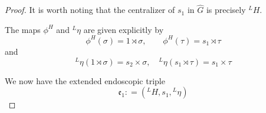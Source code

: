 \documentclass[11pt]{amsart}
\numberwithin{equation}{section}
\def\Irr{\mathrm{Irr}}
\def\H{\mathrm{H}}
\def\SO{\mathrm{SO}}
\def\PGL{\mathrm{PGL}}
\def\bW{\mathbf{W}}
\def\R{\mathbb{R}}
\def\C{\mathbb{C}}
\def\n{\mathbf{n}}
\newcommand{\<}{\left\langle}
\renewcommand{\>}{\right\rangle}
\begin{document}
\begin{proof}
  It is worth noting that the centralizer of $s_1$ in $\widehat{G}$ is precisely ${}^LH$.   
  
  
   
The maps $\phi^H$ and ${}^L\eta$ are given explicitly by
\[
\phi^H(\sigma) = 1 \rtimes \sigma, \quad \quad \phi^H(\tau) = s_1 \rtimes \tau
\]
and
\[
{}^L\eta (1 \rtimes \sigma) = s_2  \times \sigma, \quad {}^L\eta(s_1 \rtimes \tau) = s_1 \times \tau
\]




  We now have the extended endoscopic triple
  \[
  \mathfrak{e}_1: = ({}^LH, s_1, {}^L\eta)
  \] 



  
  
 

\end{proof}
\end{document}
